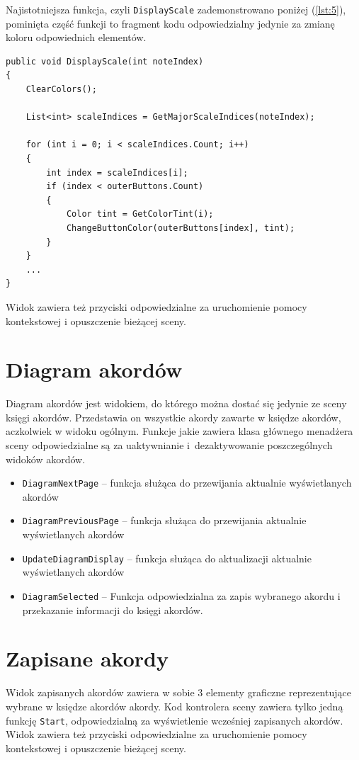 Najistotniejsza funkcja, czyli \texttt{DisplayScale} zademonstrowano poniżej (\ref{lst:5}), pominięta część funkcji to fragment kodu odpowiedzialny jedynie za zmianę koloru odpowiednich elementów.

\begin{lstlisting}[style=sharpcstyle,caption=Funkcja \texttt{DisplayScale}, label=lst:5]
public void DisplayScale(int noteIndex)
{
    ClearColors();

    List<int> scaleIndices = GetMajorScaleIndices(noteIndex);

    for (int i = 0; i < scaleIndices.Count; i++)
    {
        int index = scaleIndices[i];
        if (index < outerButtons.Count)
        {
            Color tint = GetColorTint(i);
            ChangeButtonColor(outerButtons[index], tint);
        }
    }
    ...         
}
\end{lstlisting}

Widok zawiera też przyciski odpowiedzialne za uruchomienie pomocy kontekstowej i opuszczenie bieżącej sceny.

\section{Diagram akordów}

Diagram akordów jest widokiem, do którego można dostać się jedynie ze sceny księgi akordów. Przedstawia on wszystkie akordy zawarte w księdze akordów, aczkolwiek w widoku ogólnym. Funkcje jakie zawiera klasa głównego menadżera sceny odpowiedzialne są za uaktywnianie i~dezaktywowanie poszczególnych widoków akordów.

\begin{itemize}
    \item \texttt{DiagramNextPage} -- funkcja służąca do przewijania aktualnie wyświetlanych akordów
    \item \texttt{DiagramPreviousPage} -- funkcja służąca do przewijania aktualnie wyświetlanych akordów
    \item \texttt{UpdateDiagramDisplay} -- funkcja służąca do aktualizacji aktualnie wyświetlanych akordów
    \item \texttt{DiagramSelected} -- Funkcja odpowiedzialna za zapis wybranego akordu i przekazanie informacji do księgi akordów.
\end{itemize}

\section{Zapisane akordy}

Widok zapisanych akordów zawiera w sobie 3 elementy graficzne reprezentujące wybrane w księdze akordów akordy. Kod kontrolera sceny zawiera tylko jedną funkcję \texttt{Start}, odpowiedzialną za wyświetlenie wcześniej zapisanych akordów. Widok zawiera też przyciski odpowiedzialne za uruchomienie pomocy kontekstowej i opuszczenie bieżącej sceny.